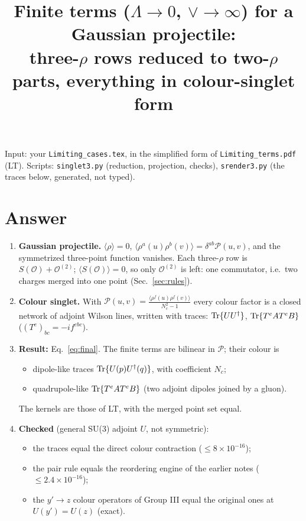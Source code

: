 \documentclass[10pt]{article}
\title{Finite terms ($\Lambda\to0$, $\vee\to\infty$) for a Gaussian projectile:\\ three-$\rho$ rows reduced to two-$\rho$ parts, everything in colour-singlet form}
\date{}
\numberwithin{equation}{section}
\newcommand{\PP}{\mathcal P}
\newcommand{\OO}{\mathcal O}
\begin{document}
\maketitle
\noindent Input: your \texttt{Limiting\_cases.tex}, in the simplified form of \texttt{Limiting\_terms.pdf} (LT). Scripts: \texttt{singlet3.py} (reduction, projection, checks), \texttt{srender3.py} (the traces below, generated, not typed).

\section{Answer}
\begin{enumerate}
\item \textbf{Gaussian projectile.} $\langle\rho\rangle=0$, $\langle\rho^a(u)\rho^b(v)\rangle=\delta^{ab}\PP(u,v)$, and the symmetrized three-point function vanishes. Each three-$\rho$ row is $S(\OO)+\OO^{(2)}$; $\langle S(\OO)\rangle=0$, so only $\OO^{(2)}$ is left: one commutator, i.e.\ two charges merged into one point (Sec.~\ref{sec:rules}).
\item \textbf{Colour singlet.} With $\PP(u,v)=\frac{\langle\rho^f(u)\rho^f(v)\rangle}{N_c^2-1}$ every colour factor is a closed network of adjoint Wilson lines, written with traces: ${\rm Tr}\{UU^\dagger\}$, ${\rm Tr}\{T^eAT^eB\}$ ($(T^e)_{bc}=-if^{ebc}$).
\item \textbf{Result:} Eq.~\eqref{eq:final}. The finite terms are bilinear in $\PP$; their colour is
\begin{itemize}
\item dipole-like traces ${\rm Tr}\{U(p)U^\dagger(q)\}$, with coefficient $N_c$;
\item quadrupole-like ${\rm Tr}\{T^eAT^eB\}$ (two adjoint dipoles joined by a gluon).
\end{itemize}
The kernels are those of LT, with the merged point set equal.
\item \textbf{Checked} (general SU(3) adjoint $U$, not symmetric):
\begin{itemize}
\item the traces equal the direct colour contraction ($\le8\times10^{-16}$);
\item the pair rule equals the reordering engine of the earlier notes ($\le2.4\times10^{-16}$);
\item the $y'\to z$ colour operators of Group III equal the original ones at $U(y')=U(z)$ (exact).
\end{itemize}
\end{enumerate}
\end{document}
